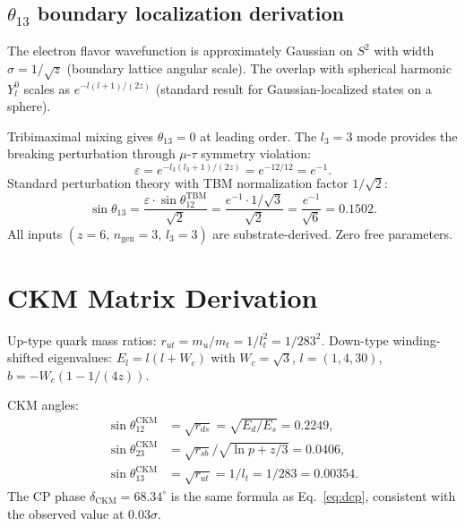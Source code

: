 \documentclass[aps,prd,twocolumn,superscriptaddress,longbibliography,nofootinbib]{revtex4-2}
\newcommand{\Stwo}{S^2}
\begin{document}
\subsection{$\theta_{13}$ boundary localization derivation}

The electron flavor wavefunction is approximately Gaussian on $\Stwo$
with width $\sigma = 1/\!\sqrt{z}$ (boundary lattice angular scale).
The overlap with spherical harmonic $Y_l^0$ scales as $e^{-l(l+1)/(2z)}$
(standard result for Gaussian-localized states on a sphere).

Tribimaximal mixing gives $\theta_{13} = 0$ at leading order.
The $l_3 = 3$ mode provides the breaking perturbation through
$\mu$-$\tau$ symmetry violation:
\begin{equation}
\varepsilon = e^{-l_3(l_3+1)/(2z)} = e^{-12/12} = e^{-1}.
\end{equation}
Standard perturbation theory with TBM normalization factor $1/\!\sqrt{2}$:
\begin{equation}
\sin\theta_{13} = \frac{\varepsilon \cdot \sin\theta_{12}^{\mathrm{TBM}}}{\sqrt{2}}
= \frac{e^{-1} \cdot 1/\!\sqrt{3}}{\sqrt{2}}
= \frac{e^{-1}}{\sqrt{6}} = 0.1502.
\end{equation}
All inputs $(z = 6,\, n_{\mathrm{gen}} = 3,\, l_3 = 3)$ are substrate-derived.
Zero free parameters.

\section{CKM Matrix Derivation}
\label{app:ckm}

Up-type quark mass ratios: $r_{ut} = m_u/m_t = 1/l_t^2 = 1/283^2$.
Down-type winding-shifted eigenvalues: $E_l = l(l + W_c)$ with
$W_c = \sqrt{3}$, $l = (1, 4, 30)$, $b = -W_c(1 - 1/(4z))$.

CKM angles:
\begin{align}
\sin\theta_{12}^{\mathrm{CKM}} &= \sqrt{r_{ds}} = \sqrt{E_d/E_s} = 0.2249, \\
\sin\theta_{23}^{\mathrm{CKM}} &= \sqrt{r_{sb}} / \sqrt{\ln p + z/3} = 0.0406, \\
\sin\theta_{13}^{\mathrm{CKM}} &= \sqrt{r_{ut}} = 1/l_t = 1/283 = 0.00354.
\end{align}
The CP phase $\delta_{\mathrm{CKM}} = 68.34^\circ$ is the same formula
as Eq.~\eqref{eq:dcp}, consistent with the observed value at $0.03\sigma$.

\end{document}
